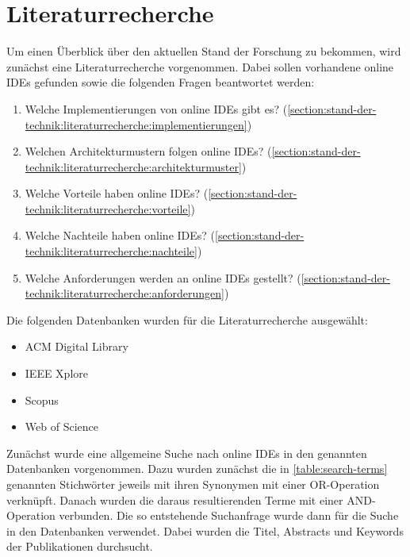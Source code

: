 \section{Literaturrecherche}\label{section:stand-der-technik:literaturrecherche}

Um einen Überblick über den aktuellen Stand der Forschung zu bekommen, wird zunächst eine Literaturrecherche vorgenommen. Dabei sollen vorhandene online IDEs gefunden sowie die folgenden Fragen beantwortet werden:

\begin{enumerate}
    \item Welche Implementierungen von online IDEs gibt es? \hfill (\autoref{section:stand-der-technik:literaturrecherche:implementierungen})
    \item Welchen Architekturmustern folgen online IDEs? \hfill (\autoref{section:stand-der-technik:literaturrecherche:architekturmuster})
    \item Welche Vorteile haben online IDEs? \hfill (\autoref{section:stand-der-technik:literaturrecherche:vorteile})
    \item Welche Nachteile haben online IDEs? \hfill (\autoref{section:stand-der-technik:literaturrecherche:nachteile})
    \item Welche Anforderungen werden an online IDEs gestellt? \hfill (\autoref{section:stand-der-technik:literaturrecherche:anforderungen})
\end{enumerate}

Die folgenden Datenbanken wurden für die Literaturrecherche ausgewählt:

\begin{itemize}
    \item ACM Digital Library \cite{noauthor_acm_nodate}
    \item IEEE Xplore \cite{noauthor_ieee-xplore_nodate}
    \item Scopus \cite{noauthor_scopus_nodate}
    \item Web of Science \cite{noauthor_web-of-science_nodate}
\end{itemize}

Zunächst wurde eine allgemeine Suche nach online IDEs in den genannten Datenbanken vorgenommen. Dazu wurden zunächst die in \autoref{table:search-terms} genannten Stichwörter jeweils mit ihren Synonymen mit einer OR-Operation verknüpft. Danach wurden die daraus resultierenden Terme mit einer AND-Operation verbunden. Die so entstehende Suchanfrage wurde dann für die Suche in den Datenbanken verwendet. Dabei wurden die Titel, Abstracts und Keywords der Publikationen durchsucht.

